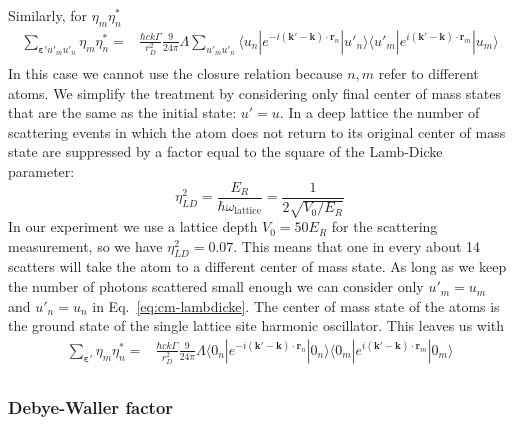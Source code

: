 \documentclass[11pt,letter]{article}
\newcommand{\bv}[1]{\ensuremath{\bm{#1}}}
\begin{document}
Similarly, for $\eta_{m}\eta_{n}^{*}$
\begin{equation}
\begin{split}
 \sum_{\bv{\varepsilon}' u'_{m} u'_{n}} \eta_{m}\eta_{n}^{*} = & 
    \frac{\hbar c k \Gamma}{r_{D}^{2}}  
    \frac{9}{24\pi} \Lambda
 \sum_{u'_{m} u'_{n}} 
      \langle u_{n} | e^{-i(\bv{k}'-\bv{k}) \cdot\bv{r}_{n}} | u'_{n}  \rangle
      \langle u'_{m} | e^{i(\bv{k}'-\bv{k}) \cdot\bv{r}_{m}} | u_{m}  \rangle \\
\end{split}
\label{eq:cm-lambdicke}
\end{equation}
In this case we cannot use the closure relation because $n,m$ refer to
different atoms.   We simplify the treatment by considering only final center
of mass states that are the same as the initial state: $u'=u$.  In a deep
lattice the number of scattering events in which the atom does not return to
its original center of mass state are suppressed by a factor equal to the
square of the Lamb-Dicke parameter:
\begin{equation}
 \eta_{LD}^{2} = \frac{E_{R}}{ \hbar \omega_{\text{lattice} }  }
  =  \frac{ 1 }{ 2\sqrt{V_{0}/E_{R}} }
\end{equation}
In our experiment we use a lattice depth $V_{0}= 50 E_{R}$ for the scattering
measurement, so we have $\eta_{LD}^{2} =  0.07$.   This means that one in every
about 14 scatters will take the atom to a different center of mass state. As
long as we keep the number of photons scattered small enough we can consider
only $u'_{m}=u_{m}$ and $u'_{n}=u_{n}$ in Eq.~\ref{eq:cm-lambdicke}.  The
center of mass state of the atoms is the ground state of the single lattice
site harmonic oscillator.  This leaves us with 
\begin{equation}
\begin{split}
 \sum_{\bv{\varepsilon}' } \eta_{m}\eta_{n}^{*} = & 
  \frac{\hbar c k \Gamma}{r_{D}^{2}}  
    \frac{9}{24\pi} \Lambda
      \langle 0_{n} | e^{-i(\bv{k}'-\bv{k}) \cdot\bv{r}_{n}} | 0_{n}  \rangle
      \langle 0_{m} | e^{i(\bv{k}'-\bv{k}) \cdot\bv{r}_{m}} | 0_{m}  \rangle \\
\end{split}
\end{equation}

\subsubsection{Debye-Waller factor} 
\end{document}
